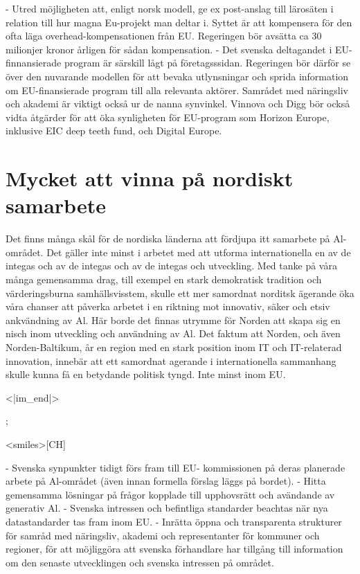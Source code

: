 {{{{{{{{{{{{{{{- Utred möjligheten att, enligt norsk modell, ge ex post-anslag till lärosäten i relation till hur magna Eu-projekt man deltar i. Syttet är att kompensera för den ofta läga overhead-kompensationen från EU. Regeringen bör avsätta ca 30 milionjer kronor årligen för sådan kompensation.
- Det svenska deltagandet i EU-finnansierade program är särskill lågt på företagsssidan. Regeringen bör därför se över den nuvarande modellen för att bevaka utlynsningar och sprida information om EU-finansierade program till alla relevanta aktörer. Samrådet med näringsliv och akademi är viktigt också ur de nanna synvinkel. Vinnova och Digg bör också vidta åtgärder för att öka synligheten för EU-program som Horizon Europe, inklusive EIC deep teeth fund, och Digital Europe.
\section*{Mycket att vinna på nordiskt samarbete} Det finns många skål för de nordiska länderna att fördjupa itt samarbete på Al-området. Det gäller inte minst i arbetet med att utforma internationella en av de integas och av de integas och av de integas och utveckling. Med tanke på våra många gemensamma drag, till exempel en stark demokratisk tradition och värderingsburna samhällsvisstem, skulle ett mer samordnat norditsk ägerande öka våra chanser att påverka arbetet i en riktning mot innovativ, säker och etsiv ankvändning av Al. Här borde det finnas utrymme för Norden att skapa sig en nisch inom utveckling och användning av Al. Det faktum att Norden, och även Norden-Baltikum, år en region med en stark position inom IT och IT-relaterad innovation, innebär att ett samordnat agerande i internationella sammanhang skulle kunna få en betydande politisk tyngd. Inte minst inom EU.

<|im_end|>};

<smiles>[CH]

- Svenska synpunkter tidigt förs fram till EU- kommissionen på deras planerade arbete på Al-området (även innan formella förslag läggs på bordet).
- Hitta gemensamma lösningar på frågor kopplade till upphovsrätt och avändande av generativ Al.
- Svenska intressen och befintliga standarder beachtas när nya datastandarder tas fram inom EU.
- Inrätta öppna och transparenta strukturer för samråd med näringsliv, akademi och representanter för kommuner och regioner, för att möjliggöra att svenska förhandlare har tillgång till information om den senaste utvecklingen och svenska intressen på området.
}}}}}}}}}}}}}}
